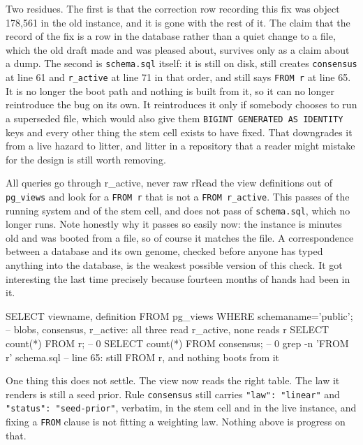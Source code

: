 Two residues. The first is that the correction row recording this fix was object 178{,}561 in the old instance, and it is gone with the rest of it. The claim that the record of the fix is a row in the database rather than a quiet change to a file, which the old draft made and was pleased about, survives only as a claim about a dump. The second is \texttt{schema.sql} itself: it is still on disk, still creates \texttt{consensus} at line 61 and \texttt{r\_active} at line 71 in that order, and still says \texttt{FROM r} at line 65. It is no longer the boot path and nothing is built from it, so it can no longer reintroduce the bug on its own. It reintroduces it only if somebody chooses to run a superseded file, which would also give them \texttt{BIGINT GENERATED AS IDENTITY} keys and every other thing the stem cell exists to have fixed. That downgrades it from a live hazard to litter, and litter in a repository that a reader might mistake for the design is still worth removing.

\begin{Correspondence}{All queries go through r\_active, never raw r}{Read the view definitions out of \texttt{pg\_views} and look for a \texttt{FROM r} that is not a \texttt{FROM r\_active}.}
This passes of the running system and of the stem cell, and does not pass of \texttt{schema.sql}, which no longer runs. Note honestly why it passes so easily now: the instance is minutes old and was booted from a file, so of course it matches the file. A correspondence between a database and its own genome, checked before anyone has typed anything into the database, is the weakest possible version of this check. It got interesting the last time precisely because fourteen months of hands had been in it.
\begin{Check}
SELECT viewname, definition FROM pg_views WHERE schemaname='public';
  -- blobs, consensus, r_active: all three read r_active, none reads r
SELECT count(*) FROM r;         -- 0
SELECT count(*) FROM consensus; -- 0
grep -n 'FROM r' schema.sql     -- line 65: still FROM r, and nothing boots from it
\end{Check}
\end{Correspondence}

One thing this does not settle. The view now reads the right table. The law it renders is still a seed prior. Rule \texttt{consensus} still carries \texttt{"law": "linear"} and \texttt{"status": "seed-prior"}, verbatim, in the stem cell and in the live instance, and fixing a \texttt{FROM} clause is not fitting a weighting law. Nothing above is progress on that.

